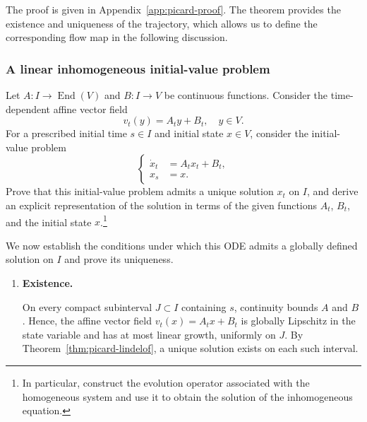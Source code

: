 \documentclass[12pt,a4paper,oneside]{book}
\begin{document}
The proof is given in Appendix~\ref{app:picard-proof}. The theorem provides the existence and uniqueness of the trajectory,
which allows us to define the corresponding flow map in the following discussion.

\subsubsection{A linear inhomogeneous initial-value problem}

\begin{example}
\label{ex:linear-inhomogeneous}\label{src:p9q1}

\begin{Question}
Let $A:I\to\operatorname{End}(V)$ and $B:I\to V$ be continuous functions. Consider the time-dependent affine vector field
\begin{equation*}
v_t(y)=A_ty+B_t, \quad y\in V.
\end{equation*}
For a prescribed initial time $s\in I$ and initial state $x\in V$, consider the initial-value problem
\begin{equation*}
\left\{
        \begin{aligned}
            \dot{x}_t &= A_tx_t+B_t,\\
            x_s &= x.
        \end{aligned}
    \right.
\end{equation*}
Prove that this initial-value problem admits a unique solution $x_t$ on $I$, and derive an explicit representation of the
solution in terms of the given functions $A_t$, $B_t$, and the initial state $x$.\footnote{In particular,
construct the evolution operator associated with the homogeneous system and use it to obtain the solution of the inhomogeneous
equation.}
\end{Question}

\begin{solution}
We now establish the conditions under which this ODE admits a globally defined solution on $I$ and prove its uniqueness.
\begin{enumerate}
    \item \textbf{Existence.}

    On every compact subinterval $J\subset I$ containing $s$, continuity bounds $A$ and $B$. Hence, the affine vector field
    $v_t(x)=A_tx+B_t$ is globally Lipschitz in the state variable and has at most linear growth, uniformly on $J$. By
    Theorem~\ref{thm:picard-lindelof}, a unique solution exists on each such interval.


\end{enumerate}
\end{solution}
\end{example}
\end{document}
